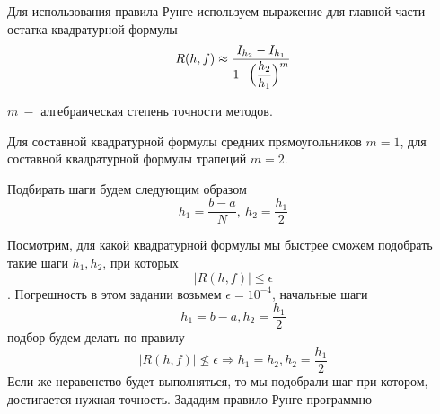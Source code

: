 \documentclass[11pt]{article}
\begin{document}
    Для использования правила Рунге используем выражение для главной части
остатка квадратурной формулы
\[R(h, f) \approx \dfrac{I_{h_2} - I_{h_1}}{1 - \Bigr( \dfrac{h_2}{h_1} \Bigl)^m}\]

\(m \ -\) алгебраическая степень точности методов.

Для составной квадратурной формулы средних прямоугольников $m=1$, для составной квадратурной формулы трапеций $m=2$.

Подбирать шаги будем следующим образом
\[h_1 = \dfrac{b-a}{N}, \ h_2 = \dfrac{h_1}{2}\]

Посмотрим, для какой квадратурной формулы мы быстрее сможем подобрать
такие шаги \(h_1, h_2\), при которых \[|R(h,f)| \leq \epsilon\].
Погрешность в этом задании возьмем \(\epsilon = 10^{-4}\), начальные
шаги \[h_1=b-a, h_2 = \frac{h_1}{2}\] подбор будем делать по правилу
\[|R(h,f)| \nleq \epsilon \Rightarrow h_1 = h_2, h_2 = \frac{h_1}{2}\]
Если же неравенство будет выполняться, то мы подобрали шаг при котором,
достигается нужная точность. Зададим правило Рунге программно
\end{document}
